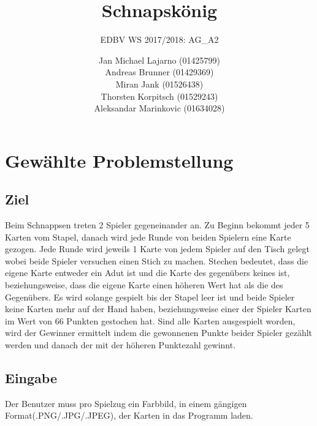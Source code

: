 \documentclass[paper=A4, deutsch]{scrartcl}
\begin{document}

\title{Schnapskönig} %

\subtitle{EDBV WS 2017/2018: AG\_A2} %


\author{Jan Michael Lajarno (01425799)\\
Andreas Brunner (01429369)\\
Miran Jank (01526438)\\
Thorsten Korpitsch (01529243)\\
Aleksandar Marinkovic (01634028)\\
}



\maketitle


\section{Gewählte Problemstellung}
\subsection{Ziel}
Beim Schnappsen treten 2 Spieler gegeneinander an. Zu Beginn bekommt jeder 5 Karten vom Stapel, danach wird jede Runde von beiden Spielern eine Karte gezogen. Jede Runde wird jeweils 1 Karte von jedem Spieler auf den Tisch gelegt wobei beide Spieler versuchen einen Stich zu machen.
Stechen bedeutet, dass die eigene Karte entweder ein Adut ist und die Karte des gegenübers keines ist, beziehungsweise, dass die eigene Karte einen höheren Wert hat als die des Gegenübers. Es wird solange gespielt bis der Stapel leer ist und beide Spieler keine Karten mehr auf der Hand haben, beziehungsweise
einer der Spieler Karten im Wert von 66 Punkten gestochen hat. Sind alle Karten ausgespielt worden, wird der Gewinner ermittelt indem die gewonnenen Punkte beider Spieler gezählt werden und danach der mit der höheren Punktezahl gewinnt.
\subsection{Eingabe}
Der Benutzer muss pro Spielzug ein Farbbild, in einem gängigen Format(.PNG/.JPG/.JPEG), der Karten in das Programm laden.
\end{document}
